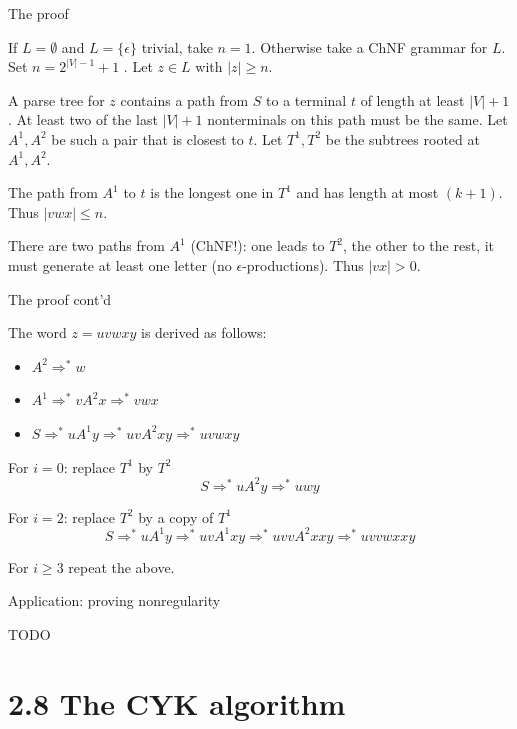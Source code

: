 \documentclass[handout]{beamer}
\begin{document}
\begin{frame}{The proof}

	If $L=\emptyset$ and $L=\{\epsilon\}$ trivial, take $n=1$. Otherwise take a ChNF grammar for $L$. Set $n=2^{|V|-1}+1$ . Let $z\in L$ with $|z|\geq n$.
	
	A parse tree for $z$ contains a path from $S$ to a terminal $t$ of length at least $|V|+1$. At least two of the last $|V|+1$ nonterminals on this path must be the same. Let $A^1, A^2$ be such a pair that is closest to $t$. Let $T^1,T^2$ be the subtrees rooted at $A^1, A^2$.
		
	The path from $A^1$ to $t$ is the longest one in $T^1$ and has length at most $(k+1)$. Thus $|vwx|\leq n $.

	There are two paths from $A^1$ (ChNF!): one leads to $T^2$, the other to the rest, it must generate at least one letter (no $\epsilon$-productions). Thus $|vx|>0$.

\end{frame}


\begin{frame}{The proof cont'd}

	The word $z=uvwxy$ is derived as follows:
	\begin{itemize}
		\item $A^2\Rightarrow^* w$
		\item $A^1\Rightarrow^*vA^2x\Rightarrow^* vwx$
		\item $S\Rightarrow^*uA^1y\Rightarrow^*uvA^2xy\Rightarrow^*uvwxy$
	\end{itemize}

	For $i=0$: replace $T^1$ by $T^2$
	$$
	S\Rightarrow^*uA^2y\Rightarrow^*uwy
	$$

	For $i=2$: replace $T^2$ by a copy of $T^1$
	$$
	S\Rightarrow^*uA^1y\Rightarrow^*uvA^1xy\Rightarrow^*uvvA^2xxy\Rightarrow^*uvvwxxy
	$$

	For $i\geq 3$ repeat the above.\hfill\qedsymbol
	
\end{frame}


\begin{frame}{Application: proving nonregularity}

	TODO
	

\end{frame}


\section{2.8 The CYK algorithm}
\end{document}

